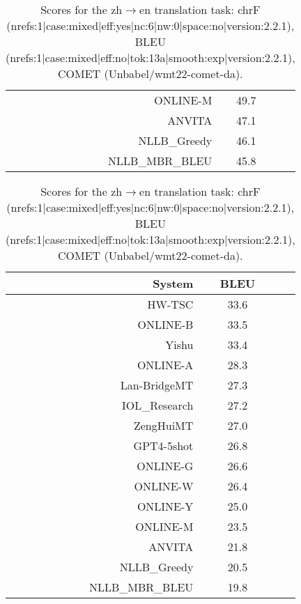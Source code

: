 \documentclass[11pt]{article}
\begin{document}
\begin{table}
\begin{subtable}[t]{0.33\textwidth}
\begin{tabular}{rcc}
\rowcolor{ashgrey} ONLINE-M  & 49.7 \\ 
ANVITA  & 47.1 \\ 
\rowcolor{ashgrey} NLLB\_Greedy  & 46.1 \\ 
\rowcolor{ashgrey} NLLB\_MBR\_BLEU  & 45.8 \\ 
\bottomrule 
\end{tabular} 
\end{subtable} 
\begin{subtable}[t]{0.33\textwidth}
\begin{tabular}{rcc}
\toprule 
System  & BLEU \\ 
\midrule 
HW-TSC  & 33.6 \\ 
\rowcolor{ashgrey} ONLINE-B  & 33.5 \\ 
\rowcolor{ashgrey} Yishu  & 33.4 \\ 
\rowcolor{ashgrey} ONLINE-A  & 28.3 \\ 
\rowcolor{ashgrey} Lan-BridgeMT  & 27.3 \\ 
IOL\_Research  & 27.2 \\ 
\rowcolor{ashgrey} ZengHuiMT  & 27.0 \\ 
\rowcolor{ashgrey} GPT4-5shot  & 26.8 \\ 
\rowcolor{ashgrey} ONLINE-G  & 26.6 \\ 
\rowcolor{ashgrey} ONLINE-W  & 26.4 \\ 
\rowcolor{ashgrey} ONLINE-Y  & 25.0 \\ 
\rowcolor{ashgrey} ONLINE-M  & 23.5 \\ 
ANVITA & 21.8 \\ 
\rowcolor{ashgrey} NLLB\_Greedy  & 20.5 \\ 
\rowcolor{ashgrey} NLLB\_MBR\_BLEU  & 19.8 \\ 
\bottomrule 
\end{tabular} 
\end{subtable}  
\caption{Scores for the zh$\rightarrow$en translation task: chrF (nrefs:1|case:mixed|eff:yes|nc:6|nw:0|space:no|version:2.2.1), BLEU (nrefs:1|case:mixed|eff:no|tok:13a|smooth:exp|version:2.2.1), COMET (Unbabel/wmt22-comet-da).} 
\end{table} 
\end{document}
